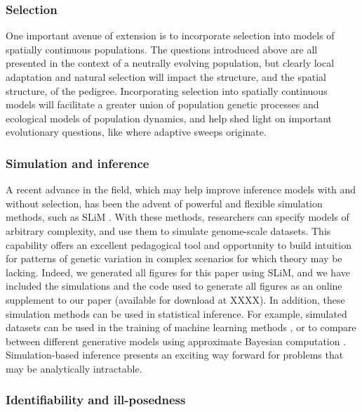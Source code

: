 \documentclass{ar-1col}
\begin{document}
\subsubsection{Selection}
One important avenue of extension is to incorporate selection into 
models of spatially continuous populations. 
The questions introduced above are all presented in the context 
of a neutrally evolving population,
but clearly local adaptation and natural selection will impact 
the structure, and the spatial structure, of the pedigree.
Incorporating selection into spatially continuous models 
will facilitate a greater union of population genetic processes 
and ecological models of population dynamics, 
and help shed light on important evolutionary questions, 
like where adaptive sweeps originate. 

\subsubsection{Simulation and inference} 
A recent advance in the field, 
which may help improve inference models with and without selection, 
has been the advent of powerful and flexible simulation methods, 
such as SLiM \citep{haller2018forward,haller2018treesequence,kelleher2018efficient}.
With these methods, 
researchers can specify models of arbitrary complexity, 
and use them to simulate genome-scale datasets.
This capability offers an excellent pedagogical tool 
and opportunity to build intuition for patterns of genetic variation 
in complex scenarios for which theory may be lacking.
Indeed, we generated all figures for this paper using SLiM, 
and we have included the simulations 
and the code used to generate all figures 
as an online supplement to our paper 
(available for download at XXXX).
In addition, these simulation methods can be used in statistical inference.
For example, simulated datasets can be used in the training 
of machine learning methods \citep[e.g.,][]{flagel2018unreasonable}, 
or to compare between different generative models using 
approximate Bayesian computation \citep{MarjoramTavare2006modern}.
Simulation-based inference presents an exciting way forward 
for problems that may be analytically intractable.

\subsubsection{Identifiability and ill-posedness}
\end{document}
